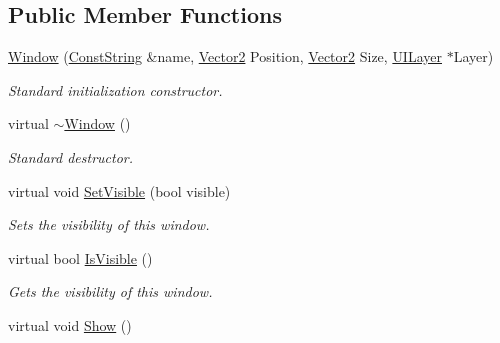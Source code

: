 \subsection*{Public Member Functions}
\begin{DoxyCompactItemize}
\item 
\hyperlink{classphys_1_1UI_1_1Window_a81bb894db3fb0dc63e2a5b6f65ecfe4d}{Window} (\hyperlink{namespacephys_a5ce5049f8b4bf88d6413c47b504ebb31}{ConstString} \&name, \hyperlink{classphys_1_1Vector2}{Vector2} Position, \hyperlink{classphys_1_1Vector2}{Vector2} Size, \hyperlink{classphys_1_1UILayer}{UILayer} $\ast$Layer)
\begin{DoxyCompactList}\small\item\em Standard initialization constructor. \item\end{DoxyCompactList}\item 
\hypertarget{classphys_1_1UI_1_1Window_a3480249de9950a3993c5e7f836aa8f59}{
virtual \hyperlink{classphys_1_1UI_1_1Window_a3480249de9950a3993c5e7f836aa8f59}{$\sim$Window} ()}
\label{d4/d86/classphys_1_1UI_1_1Window_a3480249de9950a3993c5e7f836aa8f59}

\begin{DoxyCompactList}\small\item\em Standard destructor. \item\end{DoxyCompactList}\item 
virtual void \hyperlink{classphys_1_1UI_1_1Window_a351439e78013bc87ecadcc00bce08573}{SetVisible} (bool visible)
\begin{DoxyCompactList}\small\item\em Sets the visibility of this window. \item\end{DoxyCompactList}\item 
virtual bool \hyperlink{classphys_1_1UI_1_1Window_aa1d88c50c0965510b494b51f3e5a7bf0}{IsVisible} ()
\begin{DoxyCompactList}\small\item\em Gets the visibility of this window. \item\end{DoxyCompactList}\item 
\hypertarget{classphys_1_1UI_1_1Window_af945bd84876d577d1dc6e1c7e28329a8}{
virtual void \hyperlink{classphys_1_1UI_1_1Window_af945bd84876d577d1dc6e1c7e28329a8}{Show} ()}
\label{d4/d86/classphys_1_1UI_1_1Window_af945bd84876d577d1dc6e1c7e28329a8}


\end{DoxyCompactItemize}
